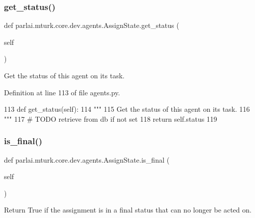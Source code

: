 \subsubsection{\texorpdfstring{get\+\_\+status()}{get\_status()}}
{\footnotesize\ttfamily def parlai.\+mturk.\+core.\+dev.\+agents.\+Assign\+State.\+get\+\_\+status (\begin{DoxyParamCaption}\item[{}]{self }\end{DoxyParamCaption})}

\begin{DoxyVerb}Get the status of this agent on its task.
\end{DoxyVerb}
 

Definition at line 113 of file agents.\+py.


\begin{DoxyCode}
113     \textcolor{keyword}{def }get\_status(self):
114         \textcolor{stringliteral}{"""}
115 \textcolor{stringliteral}{        Get the status of this agent on its task.}
116 \textcolor{stringliteral}{        """}
117         \textcolor{comment}{# TODO retrieve from db if not set}
118         \textcolor{keywordflow}{return} self.status
119 
\end{DoxyCode}
\mbox{\label{classparlai_1_1mturk_1_1core_1_1dev_1_1agents_1_1AssignState_a169e39dab458bde9c9ee494fc31fab00}} 
\subsubsection{\texorpdfstring{is\+\_\+final()}{is\_final()}}
{\footnotesize\ttfamily def parlai.\+mturk.\+core.\+dev.\+agents.\+Assign\+State.\+is\+\_\+final (\begin{DoxyParamCaption}\item[{}]{self }\end{DoxyParamCaption})}

\begin{DoxyVerb}Return True if the assignment is in a final status that can no longer be acted
on.
\end{DoxyVerb}
 


